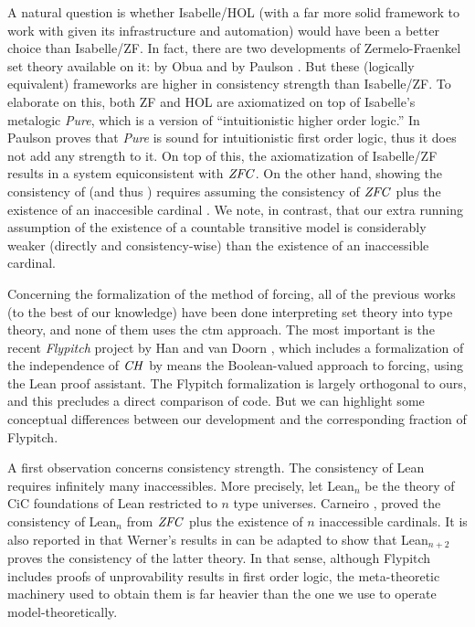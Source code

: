 A natural question is whether Isabelle/HOL (with a far more solid
framework to work with given its infrastructure and automation) would
have been a better choice than Isabelle/ZF. In fact,
there are two developments of Zermelo-Fraenkel set theory available on
it:  by Obua \cite{DBLP:conf/ictac/Obua06} and
 by Paulson
\cite{ZFC_in_HOL-AFP}. But these (logically equivalent) frameworks are
higher in consistency strength than Isabelle/ZF. To elaborate on this,
both ZF and HOL are axiomatized on top of Isabelle's metalogic
\emph{Pure}, which is a version of ``intuitionistic higher order
logic.'' In  \cite{Paulson1989} Paulson proves that \emph{Pure}
is sound for intuitionistic first order logic, thus it does not add
any strength to it. On top of this, the axiomatization of Isabelle/ZF
results in a system equiconsistent with $\mathit{ZFC}$. On the other hand,
showing the consistency of  (and thus
) requires
assuming the consistency of $\mathit{ZFC}$ plus the existence of an
inaccesible cardinal \cite[Sect.~3]{DBLP:conf/ictac/Obua06}. We note,
in contrast, that our extra running assumption of the existence of a
countable transitive model is considerably weaker (directly and
consistency-wise) than the existence of an inaccessible cardinal.

Concerning the formalization of the method 
of forcing, all of the previous works (to the best of our knowledge)
have been done interpreting set theory into type theory, and
none of them uses the ctm approach. The
most important is the recent \emph{Flypitch} project  by 
Han and van Doorn
\cite{han_et_al:LIPIcs:2019:11074,DBLP:conf/cpp/HanD20}, which includes
a formalization of the independence of $\mathit{CH}$ by means
the Boolean-valued approach to forcing, using the Lean
proof assistant. The Flypitch
formalization is largely orthogonal to ours, and this
precludes a direct comparison of code. But we can
highlight some conceptual differences between our development and the
corresponding fraction of Flypitch.

A first observation concerns consistency strength. The consistency of
Lean requires infinitely many inaccessibles. More precisely, let
Lean$_n$ be the theory of CiC foundations of Lean restricted to $n$
type universes.  Carneiro \cite{carneiro-ms-thesis}, proved the
consistency of Lean$_n$ from $\mathit{ZFC}$ plus the existence of $n$
inaccessible cardinals. It is also reported in
\cite{carneiro-ms-thesis} that Werner's results in
\cite{10.5555/645869.668660} can be adapted to show that Lean$_{n+2}$
proves the consistency of the latter theory.  In that sense, although
Flypitch includes proofs of unprovability results in first order
logic, the meta-theoretic machinery used to obtain them is far heavier
than the one we use to operate model-theoretically.

